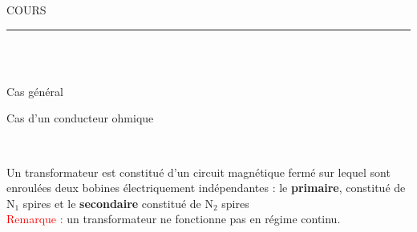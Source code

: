\documentclass[11pt,a4paper]{article}
\newcommand{\cadreblanc}[1]{%
\medskip\framebox[\linewidth][c]{%
\rule{0mm}{#1mm}}\par
\medskip}
\newenvironment{itemize*}%
    {\begin{itemize}%
      \setlength{\itemsep}{0pt}%
      \setlength{\parskip}{0pt}}%
    {\end{itemize}}
\begin{document}
\begin{center}
 \LARGE{COURS } \\[3mm]
\end{center}



\normalsize

\hrule\
\\[0,5cm]


\\
\vspace{-3mm}
\begin{itemize*}
\item Cas général



\noindent%
\begin{minipage}{.65\textwidth}%
 \cadreblanc{25}
\end{minipage}%
\hfill
\begin{minipage}{.27\textwidth}%
\cadreblanc{25}
\end{minipage}%


\item Cas d'un conducteur ohmique \\
\vspace{-5mm}
\noindent%
\begin{fleche}
\item 
\begin{minipage}{.60\textwidth}%
 \cadreblanc{25}
\end{minipage}%
\hfill
\begin{minipage}{.27\textwidth}%
\cadreblanc{25}
\end{minipage}%


\noindent%
\item 
\begin{minipage}{.60\textwidth}%
 \cadreblanc{25}
\end{minipage}%
\hfill
\begin{minipage}{.27\textwidth}%
\cadreblanc{25}
\end{minipage}%
\end{fleche}

\\
\vspace{-3mm}
\noindent%
\begin{minipage}{.58\textwidth}%
\item Un transformateur est constitué d'un circuit magnétique fermé sur lequel sont enroulées deux bobines électriquement indépendantes : le \textbf{primaire}, constitué de \textbf{$\mathrm{N_1}$ }spires et le \textbf{secondaire} constitué de \textbf{$\mathrm{N_2}$} spires \\
\textcolor{red}{Remarque :} un transformateur ne fonctionne pas en régime continu.



\end{minipage}
\end{itemize*}
\end{document}
